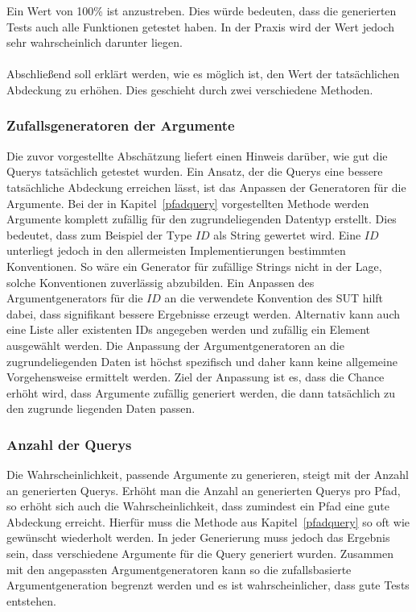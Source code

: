 Ein Wert von 100\% ist anzustreben.
Dies würde bedeuten, dass die generierten Tests auch alle Funktionen getestet haben.
In der Praxis wird der Wert jedoch sehr wahrscheinlich darunter liegen.
\\
\\

Abschließend soll erklärt werden, wie es möglich ist, den Wert der tatsächlichen Abdeckung zu erhöhen.
Dies geschieht durch zwei verschiedene Methoden.

\subsubsection{Zufallsgeneratoren der Argumente}
\label{zufallsgen}

Die zuvor vorgestellte Abschätzung liefert einen Hinweis darüber, wie gut die Querys tatsächlich getestet wurden.
Ein Ansatz, der die Querys eine bessere tatsächliche Abdeckung erreichen lässt, ist das Anpassen der Generatoren für die Argumente.
Bei der in Kapitel~\ref{pfadquery} vorgestellten Methode werden Argumente komplett zufällig für den zugrundeliegenden Datentyp erstellt.
Dies bedeutet, dass zum Beispiel der Type $ID$ als String gewertet wird.
Eine $ID$ unterliegt jedoch in den allermeisten Implementierungen bestimmten Konventionen.
So wäre ein Generator für zufällige Strings nicht in der Lage, solche Konventionen zuverlässig abzubilden.
Ein Anpassen des Argumentgenerators für die $ID$ an die verwendete Konvention des SUT hilft dabei, dass signifikant bessere Ergebnisse erzeugt werden.
Alternativ kann auch eine Liste aller existenten IDs angegeben werden und zufällig ein Element ausgewählt werden.
Die Anpassung der Argumentgeneratoren an die zugrundeliegenden Daten ist höchst spezifisch und daher kann keine allgemeine
Vorgehensweise ermittelt werden.
Ziel der Anpassung ist es, dass die Chance erhöht wird, dass Argumente zufällig generiert werden, die dann tatsächlich zu den zugrunde liegenden Daten passen.

\subsubsection{Anzahl der Querys}

Die Wahrscheinlichkeit, passende Argumente zu generieren, steigt mit der Anzahl an generierten Querys.
Erhöht man die Anzahl an generierten Querys pro Pfad, so erhöht sich auch die Wahrscheinlichkeit, dass zumindest ein Pfad eine gute Abdeckung erreicht.
Hierfür muss die Methode aus Kapitel~\ref{pfadquery} so oft wie gewünscht wiederholt werden.
In jeder Generierung muss jedoch das Ergebnis sein, dass verschiedene Argumente für die Query generiert wurden.
Zusammen mit den angepassten Argumentgeneratoren kann so die zufallsbasierte Argumentgeneration begrenzt werden
und es ist wahrscheinlicher, dass gute Tests entstehen.



